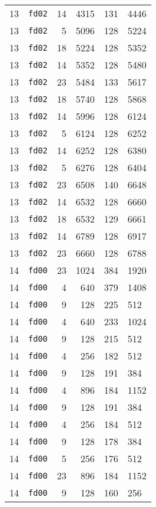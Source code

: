 \documentclass{article}
\begin{document}
\begin{table}[h!]
\begin{tabular}{llrrrl}
    13 & \texttt{fd02} & 14 & 4315 & 131 & 4446 \\
    13 & \texttt{fd02} & 5 & 5096 & 128 & 5224 \\
    13 & \texttt{fd02} & 18 & 5224 & 128 & 5352 \\
    13 & \texttt{fd02} & 14 & 5352 & 128 & 5480 \\
    13 & \texttt{fd02} & 23 & 5484 & 133 & 5617 \\
    13 & \texttt{fd02} & 18 & 5740 & 128 & 5868 \\
    13 & \texttt{fd02} & 14 & 5996 & 128 & 6124 \\
    13 & \texttt{fd02} & 5 & 6124 & 128 & 6252 \\
    13 & \texttt{fd02} & 14 & 6252 & 128 & 6380 \\
    13 & \texttt{fd02} & 5 & 6276 & 128 & 6404 \\
    13 & \texttt{fd02} & 23 & 6508 & 140 & 6648 \\
    13 & \texttt{fd02} & 14 & 6532 & 128 & 6660 \\
    13 & \texttt{fd02} & 18 & 6532 & 129 & 6661 \\
    13 & \texttt{fd02} & 14 & 6789 & 128 & 6917 \\
    13 & \texttt{fd02} & 23 & 6660 & 128 & 6788 \\
    14 & \texttt{fd00} & 23 & 1024 & 384 & 1920 \\
    14 & \texttt{fd00} & 4 & 640 & 379 & 1408 \\
    14 & \texttt{fd00} & 9 & 128 & 225 & 512 \\
    14 & \texttt{fd00} & 4 & 640 & 233 & 1024 \\
    14 & \texttt{fd00} & 9 & 128 & 215 & 512 \\
    14 & \texttt{fd00} & 4 & 256 & 182 & 512 \\
    14 & \texttt{fd00} & 9 & 128 & 191 & 384 \\
    14 & \texttt{fd00} & 4 & 896 & 184 & 1152 \\
    14 & \texttt{fd00} & 9 & 128 & 191 & 384 \\
    14 & \texttt{fd00} & 4 & 256 & 184 & 512 \\
    14 & \texttt{fd00} & 9 & 128 & 178 & 384 \\
    14 & \texttt{fd00} & 5 & 256 & 176 & 512 \\
    14 & \texttt{fd00} & 23 & 896 & 184 & 1152 \\
    14 & \texttt{fd00} & 9 & 128 & 160 & 256 \\

\end{tabular}
\end{table}
\end{document}
